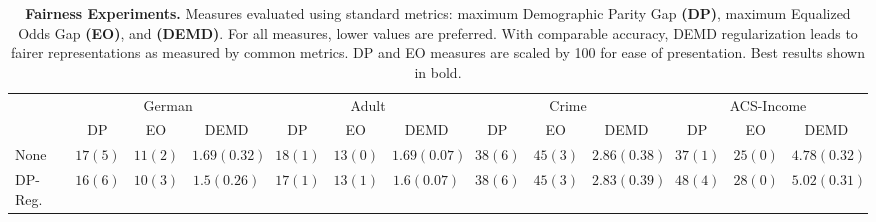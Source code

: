 \begin{table}[!t] 
	\scriptsize
	\setlength\tabcolsep{3.5pt} %
	\caption{\footnotesize \textbf{Fairness Experiments.} Measures evaluated using standard metrics: maximum Demographic Parity Gap \textbf{(DP)},  maximum Equalized Odds Gap \textbf{(EO)}, and \textbf{(DEMD)}. For all measures, lower values are preferred.  With comparable accuracy, DEMD regularization leads to fairer representations as measured by common metrics. DP and EO measures are scaled by 100 for ease of presentation. Best results shown in bold.}
	\vspace{-10pt}
	\begin{tabular*}{\linewidth}{l *{3}{c}|*{3}{c}|*{3}{c}|*{3}{c}}
		\midrule%
		& \multicolumn{3}{c}{German} & \multicolumn{3}{c}{Adult} & \multicolumn{3}{c}{Crime}& \multicolumn{3}{c}{ACS-Income} \\
		\cmidrule{2-4} \cmidrule{5-7} \cmidrule{8-10} \cmidrule{11-13}
		& DP & EO & DEMD & DP & EO & DEMD & DP & EO & DEMD & DP & EO & DEMD \\ 
		\midrule
None & $17\scriptscriptstyle(5)$ & $11\scriptscriptstyle(2)$ & $1.69\scriptscriptstyle(0.32)$ & $18\scriptscriptstyle(1)$ & $13\scriptscriptstyle(0)$ & $1.69\scriptscriptstyle(0.07)$ & $38\scriptscriptstyle(6)$ & $45\scriptscriptstyle(3)$ & $2.86\scriptscriptstyle(0.38)$ & $37\scriptscriptstyle(1)$ & $25\scriptscriptstyle(0)$ & $4.78\scriptscriptstyle(0.32)$ \\
DP-Reg. & $16\scriptscriptstyle(6)$ & $10\scriptscriptstyle(3)$ & $1.5\scriptscriptstyle(0.26)$ & $17\scriptscriptstyle(1)$ & $13\scriptscriptstyle(1)$ & $1.6\scriptscriptstyle(0.07)$ & $38\scriptscriptstyle(6)$ & $45\scriptscriptstyle(3)$ & $2.83\scriptscriptstyle(0.39)$ & $48\scriptscriptstyle(4)$ & $28\scriptscriptstyle(0)$ & $5.02\scriptscriptstyle(0.31)$ \\

\end{tabular*}
\end{table}

